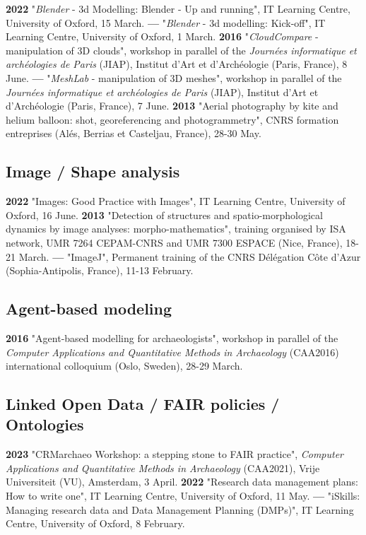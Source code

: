 \documentclass{article}
\begin{document}
\textbf{2022 }"\textit{Blender} - 3d Modelling: Blender - Up and running", IT Learning Centre, University of Oxford, 15 March.
\smallbreak
\textbf{--- }"\textit{Blender} - 3d modelling: Kick-off", IT Learning Centre, University of Oxford, 1 March.
\smallbreak
\textbf{2016 }"\textit{CloudCompare} - manipulation of 3D clouds", workshop in parallel of the \textit{Journ\'{e}es informatique et arch\'{e}ologies de Paris} (JIAP), Institut d'Art et d'Arch\'{e}ologie (Paris, France), 8 June.
\smallbreak
\textbf{--- }"\textit{MeshLab }- manipulation of 3D meshes", workshop in parallel of the \textit{Journ\'{e}es informatique et arch\'{e}ologies de Paris} (JIAP), Institut d'Art et d'Arch\'{e}ologie (Paris, France), 7 June.
\smallbreak
\textbf{2013 }"Aerial photography by kite and helium balloon: shot, georeferencing and photogrammetry", CNRS formation entreprises (Al\'{e}s, Berrias et Casteljau, France), 28-30 May.

\subsection*{Image / Shape analysis}

\textbf{2022 }"Images: Good Practice with Images", IT Learning Centre, University of Oxford, 16 June.
\smallbreak
\textbf{2013 }"Detection of structures and spatio-morphological dynamics by image analyses: morpho-mathematics", training organised by ISA network, UMR 7264 CEPAM-CNRS and UMR 7300 ESPACE (Nice, France), 18-21 March.
\smallbreak
\textbf{--- }"ImageJ", Permanent training of the CNRS D\'{e}l\'{e}gation C\^{o}te d'Azur (Sophia-Antipolis, France), 11-13 February.

\subsection*{Agent-based modeling}

\textbf{2016 }"Agent-based modelling for archaeologists", workshop in parallel of the \textit{Computer Applications and Quantitative Methods in Archaeology} (CAA2016) international colloquium (Oslo, Sweden), 28-29 March.

\subsection*{Linked Open Data / FAIR policies / Ontologies}

\textbf{2023 }"CRMarchaeo Workshop: a stepping stone to FAIR practice", \textit{Computer Applications and Quantitative Methods in Archaeology} (CAA2021), Vrije Universiteit (VU), Amsterdam, 3 April.
\smallbreak
\textbf{2022 }"Research data management plans: How to write one", IT Learning Centre, University of Oxford, 11 May.
\smallbreak
\textbf{--- }"iSkills: Managing research data and Data Management Planning (DMPs)", IT Learning Centre, University of Oxford, 8 February.
\end{document}
